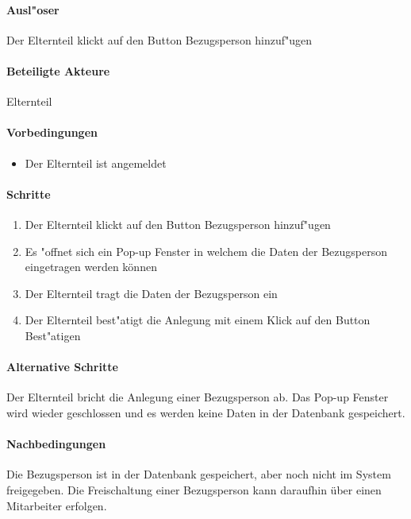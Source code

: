 		\paragraph{Ausl"oser}
		Der Elternteil klickt auf den Button \dq Bezugsperson hinzuf"ugen\dq
		\paragraph{Beteiligte Akteure}   \leavevmode \newline
		Elternteil
		\paragraph{Vorbedingungen}
			\begin{itemize}
			 	\item Der Elternteil ist angemeldet
			\end{itemize}
		
		\paragraph{Schritte}
			\begin{enumerate}
			 	\item Der Elternteil klickt auf den Button \dq Bezugsperson hinzuf"ugen\dq
			 		\item Es "offnet sich ein Pop-up Fenster in welchem die Daten der Bezugsperson eingetragen werden können
			 	\item Der Elternteil tragt die Daten der Bezugsperson ein
			 	\item Der Elternteil best"atigt die Anlegung mit einem Klick auf den Button \dq Best"atigen\dq 
			\end{enumerate}
		
		\paragraph{Alternative Schritte}
		Der Elternteil bricht die Anlegung einer Bezugsperson ab. Das Pop-up Fenster wird wieder geschlossen und es werden keine Daten in der Datenbank gespeichert. 	
		\paragraph{Nachbedingungen}
		Die Bezugsperson ist in der Datenbank gespeichert, aber noch nicht im System freigegeben. Die Freischaltung einer Bezugsperson kann daraufhin über einen Mitarbeiter erfolgen. 
		
		
		
